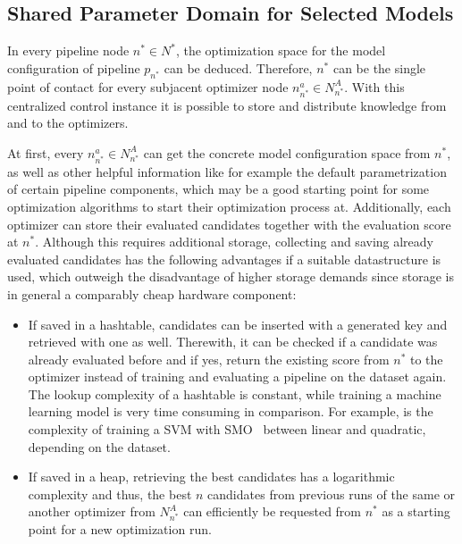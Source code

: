 \subsection{Shared Parameter Domain for Selected Models}
\label{sec:approach:configuration:parameter}
In every pipeline node $n^* \in N^*$, the optimization space for the model configuration of pipeline $p_{n^*}$ can be deduced.
Therefore, $n^*$ can be the single point of contact for every subjacent optimizer node $n^{a}_{n^*} \in N^A_{n^*}$.
With this centralized control instance it is possible to store and distribute knowledge from and to the optimizers.

At first, every $n^{a}_{n^*} \in N^A_{n^*}$ can get the concrete model configuration space from $n^*$, as well as other helpful information like for example the default parametrization of certain pipeline components, which may be a good starting point for some optimization algorithms to start their optimization process at.
Additionally, each optimizer can store their evaluated candidates together with the evaluation score at $n^*$.
Although this requires additional storage, collecting and saving already evaluated candidates has the following advantages if a suitable datastructure is used, which outweigh the disadvantage of higher storage demands since storage is in general a comparably cheap hardware component:
\begin{itemize}
    \item If saved in a hashtable, candidates can be inserted with a generated key and retrieved with one as well. Therewith, it can be checked if a candidate was already evaluated before and if yes, return the existing score from $n^*$ to the optimizer instead of training and evaluating a pipeline on the dataset again.
    The lookup complexity of a hashtable is constant, while training a machine learning model is very time consuming in comparison.
    For example, is the complexity of training a SVM with SMO~\cite{Platt-SMO} between linear and quadratic, depending on the dataset.
    \item If saved in a heap, retrieving the best candidates has a logarithmic complexity and thus, the best $n$ candidates from previous runs of the same or another optimizer from $N^A_{n^*}$ can efficiently be requested from $n^*$ as a starting point for a new optimization run.
\end{itemize}

